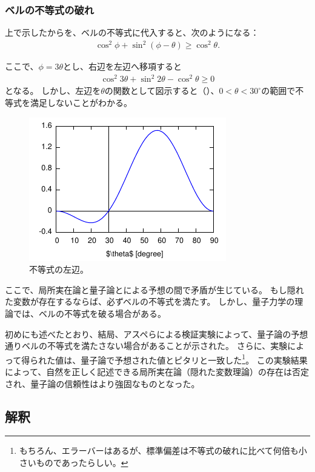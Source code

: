 \documentclass[10pt,b5paper,papersize,dvipdfmx]{jsbook}
\begin{document}
%
\subsubsection{ベルの不等式の破れ} %

上で示したからを、ベルの不等式に代入すると、次のようになる：
\begin{align*}
  \cos^2\phi + \sin^2(\phi - \theta) \ge \cos^2\theta.
\end{align*}

ここで、$\phi = 3\theta$とし、右辺を左辺へ移項すると
\begin{align}
  \cos^2 3\theta + \sin^2 2\theta - \cos^2\theta \ge 0
\end{align}
となる。
しかし、左辺を$\theta$の関数として図示すると（）、$0 < \theta < 30^\circ$の範囲で不等式を満足しないことがわかる。

\begin{figure}[htp]
  \centering
  \includegraphics{nkym/fig/Aspect.pdf}
  \caption{不等式の左辺。}
  \label{fig:left-hen}
\end{figure}

ここで、局所実在論と量子論とによる予想の間で矛盾が生じている。
もし隠れた変数が存在するならば、必ずベルの不等式を満たす。
しかし、量子力学の理論では、ベルの不等式を破る場合がある。

初めにも述べたとおり、結局、アスペらによる検証実験によって、量子論の予想通りベルの不等式を満たさない場合があることが示された。
さらに、実験によって得られた値は、量子論で予想された値とピタリと一致した\footnote{
  もちろん、エラーバーはあるが、標準偏差は不等式の破れに比べて何倍も小さいものであったらしい\cite{arafuna}。
}。
この実験結果によって、自然を正しく記述できる局所実在論（隠れた変数理論）の存在は否定され、量子論の信頼性はより強固なものとなった。

%
\subsection{解釈}
\end{document}
